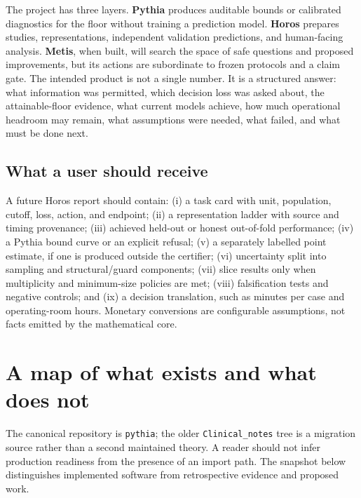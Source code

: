 \documentclass[11pt]{article}
\begin{document}
The project has three layers. \textbf{Pythia} produces auditable bounds or calibrated diagnostics for the floor without training a prediction model. \textbf{Horos} prepares studies, representations, independent validation predictions, and human-facing analysis. \textbf{Metis}, when built, will search the space of safe questions and proposed improvements, but its actions are subordinate to frozen protocols and a claim gate. The intended product is not a single number. It is a structured answer: what information was permitted, which decision loss was asked about, the attainable-floor evidence, what current models achieve, how much operational headroom may remain, what assumptions were needed, what failed, and what must be done next.

\subsection{What a user should receive}
A future Horos report should contain: (i) a task card with unit, population, cutoff, loss, action, and endpoint; (ii) a representation ladder with source and timing provenance; (iii) achieved held-out or honest out-of-fold performance; (iv) a Pythia bound curve or an explicit refusal; (v) a separately labelled point estimate, if one is produced outside the certifier; (vi) uncertainty split into sampling and structural/guard components; (vii) slice results only when multiplicity and minimum-size policies are met; (viii) falsification tests and negative controls; and (ix) a decision translation, such as minutes per case and operating-room hours. Monetary conversions are configurable assumptions, not facts emitted by the mathematical core.

\section{A map of what exists and what does not}
The canonical repository is \texttt{pythia}; the older \texttt{Clinical\_notes} tree is a migration source rather than a second maintained theory. A reader should not infer production readiness from the presence of an import path. The snapshot below distinguishes implemented software from retrospective evidence and proposed work.
\end{document}
